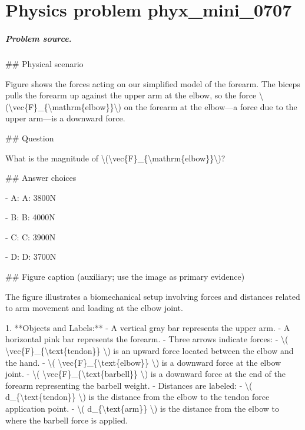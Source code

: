 
\chapter{Physics problem phyx\_mini\_0707}
\label{ch:PhyXMiniProblems_problem_phyx_mini_0707}

\paragraph{Problem source.}
\#\# Physical scenario

Figure shows the forces acting on our simplified model of the forearm. The biceps pulls the forearm up against the upper arm at the elbow, so the force \textbackslash{}(\textbackslash{}vec\{F\}\_\{\textbackslash{}mathrm\{elbow\}\}\textbackslash{}) on the forearm at the elbow—a force due to the upper arm—is a downward force.

\#\# Question

What is the magnitude of \textbackslash{}(\textbackslash{}vec\{F\}\_\{\textbackslash{}mathrm\{elbow\}\}\textbackslash{})?

\#\# Answer choices

- A: A: 3800N

- B: B: 4000N

- C: C: 3900N

- D: D: 3700N

\#\# Figure caption (auxiliary; use the image as primary evidence)

The figure illustrates a biomechanical setup involving forces and distances related to arm movement and loading at the elbow joint. 

1. **Objects and Labels:**
   - A vertical gray bar represents the upper arm.
   - A horizontal pink bar represents the forearm.
   - Three arrows indicate forces: 
     - \textbackslash{}( \textbackslash{}vec\{F\}\_\{\textbackslash{}text\{tendon\}\} \textbackslash{}) is an upward force located between the elbow and the hand.
     - \textbackslash{}( \textbackslash{}vec\{F\}\_\{\textbackslash{}text\{elbow\}\} \textbackslash{}) is a downward force at the elbow joint.
     - \textbackslash{}( \textbackslash{}vec\{F\}\_\{\textbackslash{}text\{barbell\}\} \textbackslash{}) is a downward force at the end of the forearm representing the barbell weight.
   - Distances are labeled: 
     - \textbackslash{}( d\_\{\textbackslash{}text\{tendon\}\} \textbackslash{}) is the distance from the elbow to the tendon force application point.
     - \textbackslash{}( d\_\{\textbackslash{}text\{arm\}\} \textbackslash{}) is the distance from the elbow to where the barbell force is applied.

